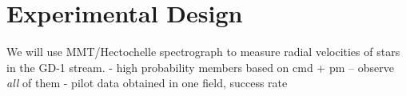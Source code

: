 \documentclass[12pt]{article}
\begin{document}
%

\pagebreak
\section*{Experimental Design}\vskip-0.2in


We will use MMT/Hectochelle spectrograph to measure radial velocities of stars in the GD-1 stream.
- high probability members based on cmd + pm -- observe \emph{all} of them
- pilot data obtained in one field, success rate
\end{document}
